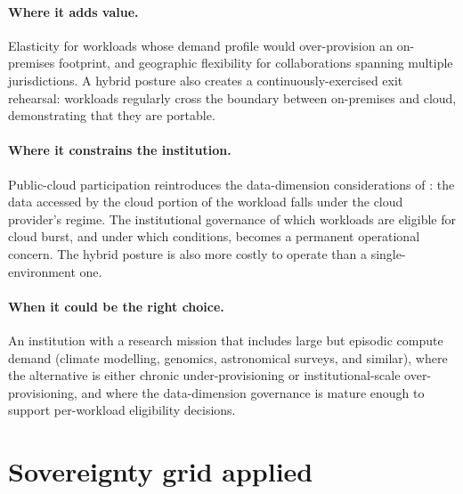 \paragraph{Where it adds value.} Elasticity for workloads whose
demand profile would over-provision an on-premises footprint, and
geographic flexibility for collaborations spanning multiple
jurisdictions. A hybrid posture also creates a continuously-exercised
exit rehearsal: workloads regularly cross the boundary between
on-premises and cloud, demonstrating that they are portable.

\paragraph{Where it constrains the institution.} Public-cloud
participation reintroduces the data-dimension considerations of
: the data accessed by the cloud
portion of the workload falls under the cloud provider's regime.
The institutional governance of which workloads are eligible for
cloud burst, and under which conditions, becomes a permanent
operational concern. The hybrid posture is also more costly to
operate than a single-environment one.

\paragraph{When it could be the right choice.} An institution
with a research mission that includes large but episodic compute
demand (climate modelling, genomics, astronomical surveys, and
similar), where the alternative is either chronic
under-provisioning or institutional-scale over-provisioning, and
where the data-dimension governance is mature enough to support
per-workload eligibility decisions.

\section{Sovereignty grid applied}
\label{sec:co-sovereignty}

